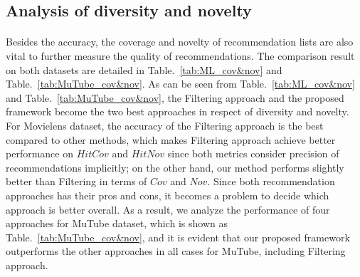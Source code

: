 \documentclass[a4paper,12pt]{report}
\begin{document}
\clearpage
\subsection{Analysis of diversity and novelty}
\paragraph{}
Besides the accuracy, the coverage and novelty of recommendation lists are also vital to further measure the quality of recommendations. The comparison result on both datasets are detailed in Table.~\ref{tab:ML_cov&nov} and Table.~\ref{tab:MuTube_cov&nov}. As can be seen from Table.~\ref{tab:ML_cov&nov} and Table.~\ref{tab:MuTube_cov&nov}, the Filtering approach and the proposed framework become the two best approaches in respect of diversity and novelty. For Movielens dataset, the accuracy of the Filtering approach is the best compared to other methods, which makes Filtering approach achieve better performance on $HitCov$ and $HitNov$ since both metrics consider precision of recommendations implicitly; on the other hand, our method performs slightly better than Filtering in terms of $Cov$ and $Nov$. Since both recommendation approaches has their pros and cons, it becomes a problem to decide which approach is better overall. As a result, we analyze the performance of four approaches for MuTube dataset, which is shown as Table.~\ref{tab:MuTube_cov&nov}, and it is evident that our proposed framework outperforms the other approaches in all cases for MuTube, including Filtering approach.
\end{document}
